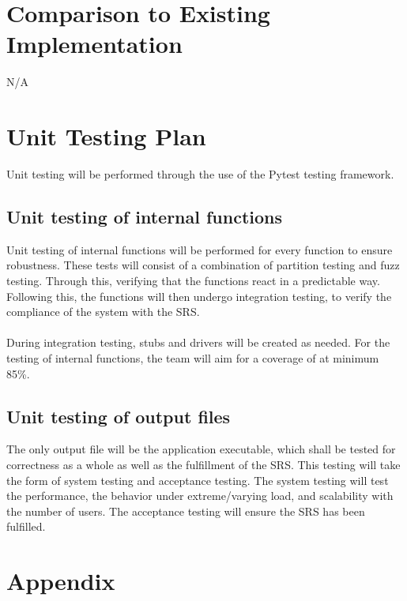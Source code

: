 \documentclass[12pt, titlepage]{article}
\begin{document}
\section{Comparison to Existing Implementation}
N/A

\section{Unit Testing Plan}
Unit testing will be performed through the use of the Pytest testing framework.

\subsection{Unit testing of internal functions}
Unit testing of internal functions will be performed for every function to ensure robustness. These tests will consist of a combination of partition testing and fuzz testing. Through this, verifying that the functions react in a predictable way. Following this, the functions will then undergo integration testing, to verify the compliance of the system with the SRS. 
\\\\
\noindent During integration testing, stubs and drivers will be created as needed. For the testing of internal functions, the team will aim for a coverage of at minimum 85\%.

\subsection{Unit testing of output files}       
The only output file will be the application executable, which shall be tested for correctness as a whole as well as the fulfillment of the SRS. This testing will take the form of system testing and acceptance testing. The system testing will test the performance, the behavior under extreme/varying load, and scalability with the number of users. The acceptance testing will ensure the SRS has been fulfilled.



\newpage

\section{Appendix}

\end{document}
